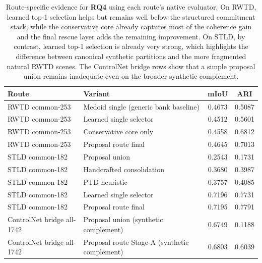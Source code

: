 \begin{table}[t]
\centering
\scriptsize
\setlength{\tabcolsep}{5pt}
\renewcommand{\arraystretch}{0.98}
\begin{tabularx}{\textwidth}{@{}p{}Xcc@{}}
\toprule
Route & Variant & mIoU & ARI \\
\midrule
RWTD common-253 & Medoid single (generic bank baseline) & 0.4673 & 0.5087 \\
RWTD common-253 & Learned single selector & 0.4512 & 0.5601 \\
RWTD common-253 & Conservative core only & 0.4558 & 0.6812 \\
RWTD common-253 & Proposal route final & 0.4645 & 0.7013 \\
\midrule
STLD common-182 & Proposal union & 0.2543 & 0.1731 \\
STLD common-182 & Handcrafted consolidation & 0.3680 & 0.3987 \\
STLD common-182 & PTD heuristic & 0.3757 & 0.4085 \\
STLD common-182 & Learned single selector & 0.7196 & 0.7731 \\
STLD common-182 & Proposal route final & 0.7195 & 0.7791 \\
\midrule
ControlNet bridge all-1742 & Proposal union (synthetic complement) & 0.6749 & 0.1188 \\
ControlNet bridge all-1742 & Proposal route Stage-A (synthetic complement) & 0.6803 & 0.6039 \\
\bottomrule
\end{tabularx}
\caption{Route-specific evidence for \textbf{RQ4} using each route's native evaluator. On RWTD, learned top-1 selection helps but remains well below the structured commitment stack, while the conservative core already captures most of the coherence gain and the final rescue layer adds the remaining improvement. On STLD, by contrast, learned top-1 selection is already very strong, which highlights the difference between canonical synthetic partitions and the more fragmented natural RWTD scenes. The ControlNet bridge rows show that a simple proposal union remains inadequate even on the broader synthetic complement.}
\label{tab:proposal_ablation}
\end{table}

